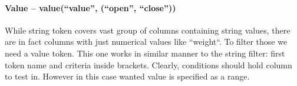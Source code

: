 
\paragraph{Value -- value(``value'', (``open'', ``close''))}
While string token covers vast group of columns containing string values, there are in fact columns with just numerical values like ``weight``. To filter those we need a value token. This one works in similar manner to the string filter: first token name and criteria inside brackets. Clearly, conditions should hold column to test in. However in this case wanted value is specified as a range.